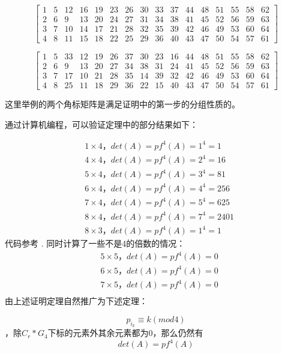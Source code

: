 \documentclass{amsc}          %
\numberwithin{equation}{section} %
\begin{document}
$$\left[\begin{array}{cccccccccccccccccc}
1 & 5 & 12 & 16 & 19 & 23 & 26 & 30 & 33 & 37 & 44 & 48 & 51 & 55 & 58 & 62\\
2 & 6 & 9 & 13 & 20 & 24 & 27 & 31 & 34 & 38 & 41 & 45 & 52 & 56 & 59 & 63\\
3 & 7 & 10 & 14 & 17 & 21 & 28 & 32 & 35 & 39 & 42 & 46 & 49 & 53 & 60 & 64\\
4 & 8 & 11 & 15 & 18 & 22 & 25 & 29 & 36 & 40 & 43 & 47 & 50 & 54 & 57 & 61
\end{array}\right]$$

$$\left[\begin{array}{cccccccccccccccccc}
1&5&33&12&19&26&37&30&23&16&44&48&51&55&58&62\\
2&6&9&13&20&27&34&38&31&24&41&45&52&56&59&63\\
3&7&17&10&21&28&35&14&39&32&42&46&49&53&60&64\\
4&8&25&11&18&29&36&22&15&40&43&47&50&54&57&61
\end{array}\right]$$

这里举例的两个角标矩阵是满足证明中的第一步的分组性质的。

通过计算机编程，可以验证定理中的部分结果如下：

\begin{align*}
&1 \times4，det(A) = pf^{4}(A) = 1^{4}=1\\
&4 \times4，det(A) = pf^{4}(A) = 2^{4}=16\\
&5 \times4，det(A) = pf^{4}(A) = 3^{4}=81\\
&6 \times4，det(A) = pf^{4}(A) = 4^{4}=256\\
&7 \times4，det(A) = pf^{4}(A) = 5^{4}=625\\
&8 \times4，det(A) = pf^{4}(A) = 7^{4}=2401\\
&8 \times3，det(A) = pf^{4}(A) = 1^{4}=1
\end{align*}
代码参考 \cite{IM}.
同时计算了一些不是4的倍数的情况：
\begin{align*}
&5 \times5，det(A) = pf^{4}(A) =0\\
&6 \times5，det(A) = pf^{4}(A) =0\\
&7 \times5，det(A) = pf^{4}(A) =0\\
\end{align*}
由上述证明定理自然推广为下述定理：

\begin{theorem}
\begin{equation}p_{i_{k}} \equiv k (mod 4) \end{equation}，除$C_{r}*G_{4}$下标的元素外其余元素都为0，那么仍然有$$det(A)=pf^{4}(A)$$
\end{theorem}
\end{document}
